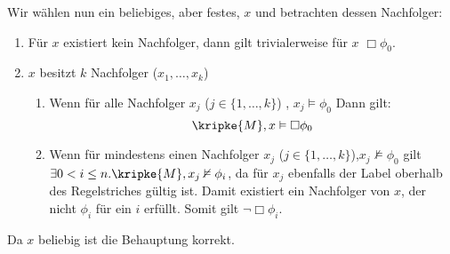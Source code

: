 Wir wählen nun ein beliebiges, aber festes, $x$ und betrachten dessen
Nachfolger:
\begin{enumerate}
	\item Für $x$ existiert kein Nachfolger, dann gilt trivialerweise für $x$
		$\Box \phi_0$.
	\item $x$ besitzt $k$ Nachfolger ($x_1, \dots, x_k$)
		\begin{enumerate}
			\item Wenn für alle Nachfolger $x_j$ ($j \in \{1, \dots, k\}$)
				, $x_j \vDash \phi_0$
				Dann gilt:
				\[\kripke{M}, x \vDash \Box \phi_0\]
			\item Wenn für mindestens einen Nachfolger $x_j$ ($j \in \{1,
				\dots,k\}$),$x_j \nvDash \phi_0$ gilt $\exists 0 < i \leq n.\kripke{M},x_j \nvDash
				\phi_i$, da für $x_j$ ebenfalls der Label oberhalb des
				Regelstriches gültig ist. Damit existiert ein Nachfolger von
				$x$, der nicht $\phi_i$ für ein $i$ erfüllt. Somit gilt $\neg
				\Box \phi_i$.
		\end{enumerate}
\end{enumerate}
Da $x$ beliebig ist die Behauptung korrekt.

